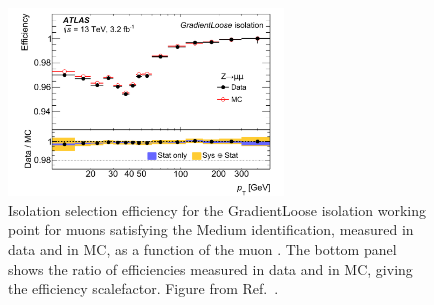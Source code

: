 \begin{figure}[!htb]
    \begin{center}
        \includegraphics[width=0.65\textwidth]{figures/chapter3/iso_eff_muon}
        \caption{
            Isolation selection efficiency for the GradientLoose isolation working point for muons satisfying
            the Medium identification,
            measured in data and in MC, as a function of the muon \pT.
            The bottom panel shows the ratio of efficiencies measured in data and in MC, giving
            the efficiency scalefactor.
            Figure from Ref.~\cite{Aad:2016jkr}.
        }
        \label{fig:muon_iso_eff}
    \end{center}
\end{figure}

\FloatBarrier
